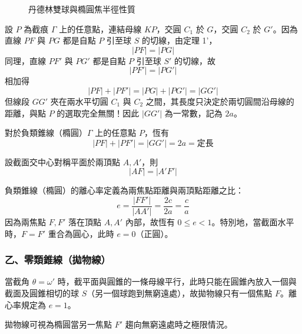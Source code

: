 \begin{figure}[H]
\caption{丹德林雙球與橢圓焦半徑性質}
\label{fig:b4s-2-4-1}
\end{figure}

設 $P$ 為截痕 $\Gamma$ 上的任意點，連結母線 $KP$，交圓 $C_1$ 於 $G$，交圓 $C_2$ 於 $G'$。因為直線 $PF$ 與 $PG$ 都是自點 $P$ 引至球 $S$ 的切線，由定理 1'，
\[ |PF| = |PG| \]
同理，直線 $PF'$ 與 $PG'$ 都是自點 $P$ 引至球 $S'$ 的切線，故
\[ |PF'| = |PG'| \]
相加得
\[ |PF| + |PF'| = |PG| + |PG'| = |GG'| \]
但線段 $GG'$ 夾在兩水平切圓 $C_1$ 與 $C_2$ 之間，其長度只決定於兩切圓間沿母線的距離，與點 $P$ 的選取完全無關！因此 $|GG'|$ 為一常數，記為 $2a$。

\begin{proposition}[命題 1（負類錐線焦半徑性質）]
對於負類錐線（橢圓）$\Gamma$ 上的任意點 $P$，恆有
\begin{equation}
|PF| + |PF'| = |GG'| = 2a = \text{定長} \label{eq:b4s-2-4-1}
\end{equation}
\end{proposition}

\begin{corollary}[系理 1]
設截面交中心對稱平面於兩頂點 $A, A'$，則
\[ |AF| = |A'F'| \]
\end{corollary}

\begin{definition}[定義]
負類錐線（橢圓）的離心率定義為兩焦點距離與兩頂點距離之比：
\begin{equation}
e = \frac{|FF'|}{|AA'|} = \frac{2c}{2a} = \frac{c}{a} \label{eq:b4s-2-4-ecc}
\end{equation}
因為兩焦點 $F, F'$ 落在頂點 $A, A'$ 內部，故恆有 $0 \le e < 1$。特別地，當截面水平時，$F = F'$ 重合為圓心，此時 $e = 0$（正圓）。
\end{definition}

\subsubsection*{乙、零類錐線（拋物線）}

當截角 $\theta = \omega'$ 時，截平面與圓錐的一條母線平行，此時只能在圓錐內放入一個與截面及圓錐相切的球 $S$（另一個球跑到無窮遠處），故拋物線只有一個焦點 $F$。離心率規定為 $e = 1$。

\begin{proposition}[命題 2]
拋物線可視為橢圓當另一焦點 $F'$ 趨向無窮遠處時之極限情況。
\end{proposition}

